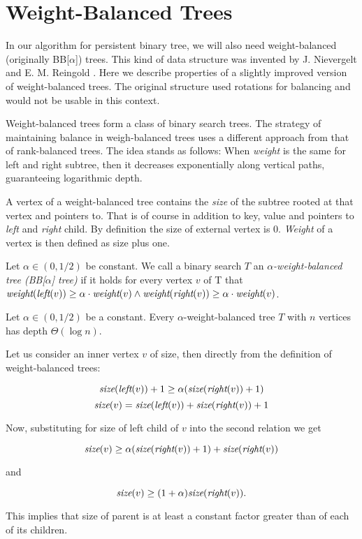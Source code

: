 \section{Weight-Balanced Trees}

In our algorithm for persistent binary tree, we will also need weight-balanced (originally BB[$\alpha$]) trees. This kind of data structure was invented by J. Nievergelt and E. M. Reingold \cite{weight-balanced}. Here we describe properties of a slightly improved version of weight-balanced trees. The original structure used rotations for balancing and would not be usable in this context.

Weight-balanced trees form a class of binary search trees. The strategy of maintaining balance in weigh-balanced trees uses a different approach from that of rank-balanced trees. The idea stands as follows: When \emph{weight} is the same for left and right subtree, then it decreases exponentially along vertical paths, guaranteeing logarithmic depth.

A vertex of a weight-balanced tree contains the {\em size} of the subtree rooted at that vertex and pointers to. That is of course in addition to key, value and pointers to {\em left} and {\em right} child. By definition the size of external vertex is 0. {\em Weight} of a vertex is then defined as size plus one.

\begin{defn}
Let $\alpha \in (0,1/2)$ be constant. We call a binary search $T$ an {\em $\alpha$-weight-balanced tree (BB[$\alpha$] tree)} if it holds for every vertex $v$ of T that $\text{\it weight}(\text{\it left}(v)) \geq \alpha \cdot \text{\it weight}(v) \wedge \text{\it weight}(\text{\it right}(v)) \geq \alpha \cdot \text{\it weight}(v) $.
\end{defn}

\begin{prop}
Let $\alpha \in (0,1/2)$ be a constant. Every $\alpha$-weight-balanced tree $T$ with $n$ vertices has depth $\Theta(\log n)$. 
\end{prop}

\begin{myproof}
Let us consider an inner vertex $v$ of size, then directly from the definition of weight-balanced trees:

$$ \text{\it size}(\text{\it left}(v)) + 1 \geq \alpha (\text{\it size}(\text{\it right}(v))+1)$$
$$ \text{\it size}(v) = \text{\it size}(\text{\it left}(v)) + \text{\it size}(\text{\it right}(v)) + 1 $$

Now, substituting for size of left child of $v$ into the second relation we get

$$ \text{\it size}(v) \geq \alpha (\text{\it size}(\text{\it right}(v)) + 1) + \text{\it size}(\text{\it right}(v)) $$

and

$$ \text{\it size}(v) \geq (1+\alpha)\text{\it size}(\text{\it right}(v)).$$

This implies that size of parent is at least a constant factor greater than of each of its children.
\end{myproof}

